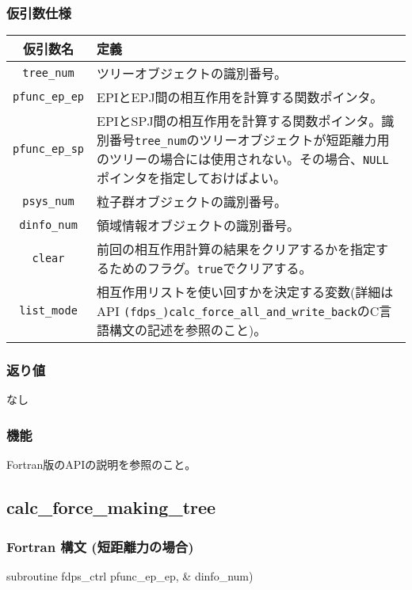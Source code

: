 \subsubsection*{仮引数仕様}
\begin{table}[h]
\begin{tabularx}{\linewidth}{cX}
\toprule
\rowcolor{Snow2}
仮引数名 & 定義 \\
\midrule
\verb|tree_num|    & ツリーオブジェクトの識別番号。\\
\verb|pfunc_ep_ep| & EPIとEPJ間の相互作用を計算する関数ポインタ。\\
\verb|pfunc_ep_sp| & EPIとSPJ間の相互作用を計算する関数ポインタ。識別番号\verb|tree_num|のツリーオブジェクトが短距離力用のツリーの場合には使用されない。その場合、\texttt{NULL}ポインタを指定しておけばよい。\\
\verb|psys_num|    & 粒子群オブジェクトの識別番号。\\
\verb|dinfo_num|   & 領域情報オブジェクトの識別番号。\\
\verb|clear|       & 前回の相互作用計算の結果をクリアするかを指定するためのフラグ。\texttt{true}でクリアする。\\
\verb|list_mode|   & 相互作用リストを使い回すかを決定する変数(詳細はAPI \texttt{(fdps\_)calc\_force\_all\_and\_write\_back}のC言語構文の記述を参照のこと)。\\
\bottomrule
\end{tabularx}
\end{table}

\subsubsection*{返り値}
なし

\subsubsection*{機能}
Fortran版のAPIの説明を参照のこと。
\clearpage


\subsection{calc\_force\_making\_tree}
\subsubsection*{Fortran 構文 (短距離力の場合)}
\begin{screen}
\begin{spverbatim}
subroutine fdps_ctrl%
                                            pfunc_ep_ep, &
                                            dinfo_num)
\end{spverbatim}
\end{screen}

